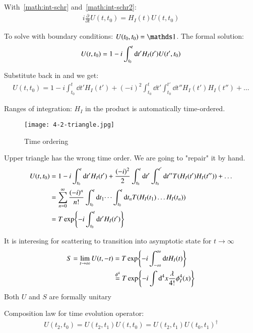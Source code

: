 With~\ref{math:int-schr} and~\ref{math:int-schr2}:
\begin{align}
	i\frac{\partial}{\partial t} U(t,t_0) = H_I(t)U(t,t_0)
\end{align}

To solve with boundary conditions: $U(t_0, t_0) = \id$. The formal solution:
\begin{align}
	U(t,t_0) = 1 - i \int_{t_0}^t \dd t' H_I(t')U(t',t_0) \notag
\end{align}

Substitute back in and we get:
\begin{align}
	U(t,t_0) = 1- i \int_{t_0}^t \dd t' H_I(t') + (-i)^2 \int_{t_0}^t \dd t' \int^{t'}_{t_0} \dd t'' H_I(t') H_I(t'') + \dots
\end{align}

Ranges of integration: $H_I$ in the product is automatically time-ordered.

\begin{figure}[ht]
	\centering
	\texttt{[image: 4-2-triangle.jpg]}
	\caption{Time ordering}
	\label{fig:4-2-triangle}
\end{figure}

Upper triangle has the wrong time order. We are going to "repair" it by hand.
\begin{align}
	U(t,t_0) &= 1-i\int_{t_0}^t \dd t' H_I(t') + \frac{(-i)^2}{2} \int_{t_0}^t \dd t' \int^{t'}_{t_0} \dd t'' T(H_I(t') H_I(t'')) + \dots \notag\\
			 &= \sum_{n=0}^{\infty} \frac{(-i)^n}{n!}\int_{t_0}^t \dd t_1 \dots \int_{t_0}^t \dd t_n T(H_I(t_1) \dots H_I(t_n))  \notag\\
			 &= T \exp{-i\int_{t_0}^t \dd t' H_I(t') }
\end{align}

It is interesing for scattering to transition into asymptotic state for $t \rightarrow \infty$
\begin{align}
	S = \lim_{t \rightarrow \infty} U(t,-t) &= T \exp{-i \int_{-\infty}^\infty \dd t H_I(t)} \\
	 &\stackrel{\phi^4}{=} T \exp{-i\int \dd^4 x \frac{\lambda}{4!} \phi_I^4(x)} \notag
\end{align}
Both $U$ and $S$ are formally unitary

Composition law for time evolution operator: 
\begin{align}
	U(t_2, t_0) = U(t_2, t_1) U(t,t_0) = U(t_2, t_1) U(t_0, t_1)^\dagger
\end{align}

